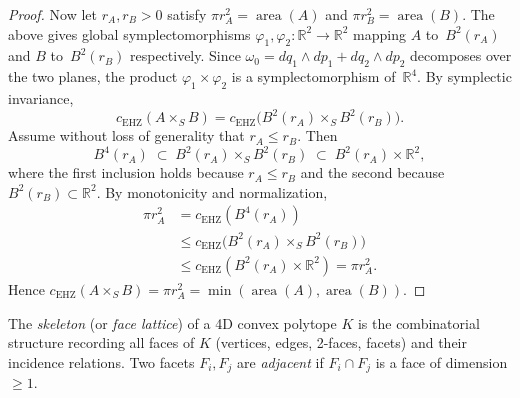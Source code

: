 \begin{unverified}
\begin{proof}
Now let $r_A, r_B > 0$ satisfy
$\pi r_A^2 = \operatorname{area}(A)$ and
$\pi r_B^2 = \operatorname{area}(B)$.
The above gives global symplectomorphisms
$\varphi_1, \varphi_2 \colon \mathbb{R}^2 \to \mathbb{R}^2$
mapping $A$ to~$B^2(r_A)$ and $B$ to~$B^2(r_B)$
respectively.
Since $\omega_0 = dq_1 \wedge dp_1 + dq_2 \wedge dp_2$
decomposes over the two planes, the product
$\varphi_1 \times \varphi_2$ is a symplectomorphism
of~$\mathbb{R}^4$.
By symplectic invariance,
\[
  c_{\mathrm{EHZ}}(A \times_S B)
    = c_{\mathrm{EHZ}}\bigl(B^2(r_A) \times_S B^2(r_B)\bigr).
\]
Assume without loss of generality that $r_A \leq r_B$.
Then
\[
  B^4(r_A)
    \;\subset\; B^2(r_A) \times_S B^2(r_B)
    \;\subset\; B^2(r_A) \times \mathbb{R}^2,
\]
where the first inclusion holds because $r_A \leq r_B$
and the second because $B^2(r_B) \subset \mathbb{R}^2$.
By monotonicity and normalization,
\begin{align*}
  \pi r_A^2
    &= c_{\mathrm{EHZ}}(B^4(r_A)) \\
    &\leq c_{\mathrm{EHZ}}\bigl(B^2(r_A) \times_S B^2(r_B)\bigr) \\
    &\leq c_{\mathrm{EHZ}}(B^2(r_A) \times \mathbb{R}^2)
    = \pi r_A^2.
\end{align*}
Hence $c_{\mathrm{EHZ}}(A \times_S B)
  = \pi r_A^2
  = \min(\operatorname{area}(A), \operatorname{area}(B))$.
\end{proof}
\end{unverified}






\begin{unverified}
\begin{definition}\label{def:face-lattice}
The \emph{skeleton} (or \emph{face lattice}) of a 4D convex polytope $K$
is the combinatorial structure recording all faces of $K$
(vertices, edges, 2-faces, facets) and their incidence relations.
Two facets $F_i, F_j$ are \emph{adjacent} if $F_i \cap F_j$ is a
face of dimension $\geq 1$.
\end{definition}
\end{unverified}






